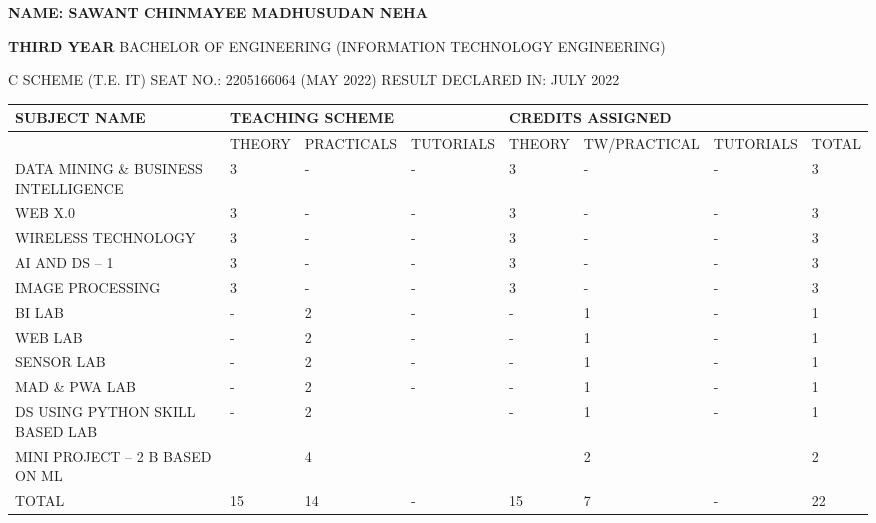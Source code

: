 \documentclass{article} %
\begin{document}
\noindent \textbf{\underbar{}}

\noindent \textbf{\underbar{}}

\noindent \textbf{\underbar{}}

\textbf{\underbar{}}

\textbf{}

\noindent 

\noindent \textbf{NAME: SAWANT CHINMAYEE MADHUSUDAN NEHA}

\noindent \textbf{}

\noindent \textbf{THIRD YEAR} BACHELOR OF ENGINEERING (INFORMATION TECHNOLOGY ENGINEERING)\textbf{\underbar{}}

\noindent \textbf{\underbar{}}

\noindent \textbf{  } C SCHEME (T.E. IT)            SEAT NO.: 2205166064 (MAY 2022)        RESULT DECLARED IN: JULY 2022

\noindent 

\noindent 

\begin{tabular}{|p{1.0in}|p{0.4in}|p{0.6in}|p{0.5in}|p{0.4in}|p{0.5in}|p{0.5in}|p{0.4in}|} \hline 
SUBJECT NAME & \multicolumn{3}{|p{1.5in}|}{TEACHING SCHEME} & \multicolumn{4}{|p{1.8in}|}{CREDITS ASSIGNED} \\ \hline 
 & THEORY & PRACTICALS & TUTORIALS & THEORY & TW/\newline PRACTICAL & TUTORIALS & TOTAL \\ \hline 
DATA MINING \& BUSINESS INTELLIGENCE & 3 & - & - & 3 & - & - & 3 \\ \hline 
WEB X.0 & 3 & - & - & 3 & - & - & 3 \\ \hline 
WIRELESS TECHNOLOGY & 3 & - & - & 3 & - & - & 3 \\ \hline 
AI AND DS -- 1 & 3 & - & - & 3 & - & - & 3 \\ \hline 
IMAGE PROCESSING & 3 & - & - & 3 & - & - & 3 \\ \hline 
BI LAB & - & 2 & - & - & 1 & - & 1 \\ \hline 
WEB LAB & - & 2 & - & - & 1 & - & 1 \\ \hline 
SENSOR LAB & - & 2 & - & - & 1 & - & 1 \\ \hline 
MAD \& PWA LAB & - & 2 & - & - & 1 & - & 1 \\ \hline 
DS USING PYTHON SKILL BASED LAB & - & 2 &  & - & 1 & - & 1 \\ \hline 
MINI PROJECT -- 2 B BASED ON ML &  & 4 &  &  & 2 &  & 2 \\ \hline 
TOTAL & 15 & 14 & - & 15 & 7 & - & 22 \\ \hline 
\end{tabular}
\end{document}
